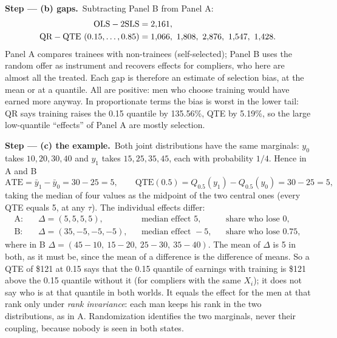 \documentclass[11pt,a4paper]{article}
\newcommand{\passo}[2]{\par\smallskip\noindent\textbf{Step --- #1.}~#2}
\begin{document}
\begin{sol}
\passo{(b) gaps}{Subtracting Panel B from Panel A:
\begin{align}
\text{OLS}-\text{2SLS}&=2{,}161,\notag\\
\text{QR}-\text{QTE}\ (0.15,\dots,0.85)&=1{,}066,\ 1{,}808,\ 2{,}876,\ 1{,}547,\ 1{,}428.\label{q19:gap}
\end{align}
Panel A compares trainees with non-trainees (self-selected); Panel B uses the random offer as instrument
and recovers effects for compliers, who here are almost all the treated. Each gap is therefore an estimate
of selection bias, at the mean or at a quantile. All are positive: men who choose training would have
earned more anyway. In proportionate terms the bias is worst in the lower tail: QR says training raises
the 0.15 quantile by 135.56\%, QTE by 5.19\%, so the large low-quantile ``effects'' of Panel A are mostly
selection.}

\passo{(c) the example}{Both joint distributions have the same marginals: $y_0$ takes $10,20,30,40$ and
$y_1$ takes $15,25,35,45$, each with probability $1/4$. Hence in A and B
\begin{equation}
\text{ATE}=\bar y_1-\bar y_0=30-25=5,\qquad \text{QTE}(0.5)=Q_{0.5}(y_1)-Q_{0.5}(y_0)=30-25=5,\label{q19:same}
\end{equation}
taking the median of four values as the midpoint of the two central ones (every QTE equals 5, at any
$\tau$). The individual effects differ:
\begin{align}
\text{A:}&\quad \Delta=(5,5,5,5),&&\text{median effect }5,&&\text{share who lose }0,\label{q19:A}\\
\text{B:}&\quad \Delta=(35,-5,-5,-5),&&\text{median effect }-5,&&\text{share who lose }0.75,\label{q19:B}
\end{align}
where in B $\Delta=(45-10,\ 15-20,\ 25-30,\ 35-40)$. The mean of $\Delta$ is 5 in both, as it must be, since the mean of a difference is the difference of
means. So a QTE of \$121 at 0.15 says that the 0.15 quantile of earnings with training is \$121 above the
0.15 quantile without it (for compliers with the same $X_i$); it does not say who is at that quantile in
both worlds. It equals the effect for the men at that rank only under \emph{rank invariance}: each man
keeps his rank in the two distributions, as in A. Randomization identifies the two marginals, never their
coupling, because nobody is seen in both states.}


\end{sol}
\end{document}

